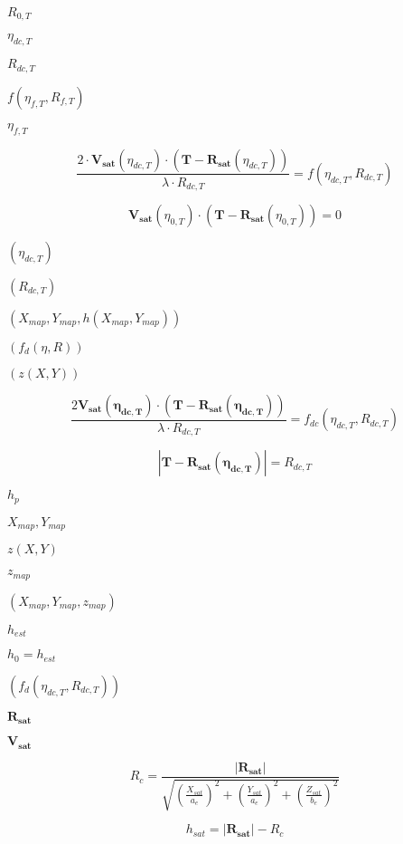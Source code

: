 \documentclass{article}
\begin{document}
$R_{0,T}$
\pagebreak

$\eta_{dc,T}$
\pagebreak

$R_{dc,T}$
\pagebreak

$f\left(\eta_{f,T},R_{f,T}\right)$
\pagebreak

$ \eta_{f,T}$
\pagebreak

\[ \frac{2 \cdot \mathbf{V_{sat}}\left( \eta_{dc,T} \right) \cdot \left( \mathbf{T} - \mathbf{R_{sat}}\left(\eta_{dc,T}\right) \right)}{\lambda \cdot R_{dc,T}} = f\left(\eta_{dc,T}, R_{dc,T}\right) \]
\pagebreak

\[ \mathbf{V_{sat}}\left( \eta_{0,T} \right) \cdot \left( \mathbf{T} - \mathbf{R_{sat}}\left(\eta_{0,T}\right) \right) = 0 \]
\pagebreak

$ \left( \eta_{dc,T} \right) $
\pagebreak

$\left( R_{dc,T}\right) $
\pagebreak

$\left(X_{map}, Y_{map}, h\left(X_{map}, Y_{map}\right)\right)$
\pagebreak

$\left( f_d\left(\eta,R\right)\right)$
\pagebreak

$ \left(z\left( X, Y\right)\right)$
\pagebreak

\[ \frac{2 \mathbf{V_{sat}\left(\eta_{dc,T}\right)} \cdot \left( \mathbf{T} - \mathbf{R_{sat}\left(\eta_{dc,T}\right)} \right)}{\lambda \cdot R_{dc,T}} = f_{dc}\left(\eta_{dc,T}, R_{dc,T} \right) \]
\pagebreak

\[ \left| \mathbf{T} - \mathbf{R_{sat}\left(\eta_{dc,T}\right)} \right | = R_{dc,T} \]
\pagebreak

$h_p$
\pagebreak

$X_{map}, Y_{map}$
\pagebreak

$ z\left(X,Y\right) $
\pagebreak

$z_{map}$
\pagebreak

$\left(X_{map}, Y_{map}, z_{map}\right)$
\pagebreak

$h_{est}$
\pagebreak

$h_0 = h_{est}$
\pagebreak

$ \left( f_{d}\left(\eta_{dc,T}, R_{dc,T}\right) \right) $
\pagebreak

$\mathbf{R_{sat}}$
\pagebreak

$\mathbf{V_{sat}}$
\pagebreak

\[ R_c =\frac{\left| \mathbf{R_{sat}}\right|} {\sqrt{ \left( \frac{X_{sat}}{a_e} \right)^2 + \left( \frac{Y_{sat}}{a_e} \right)^2 + \left( \frac{Z_{sat}}{b_e} \right)^2 }} \]
\pagebreak

\[ h_{sat} = \left| \mathbf{R_{sat}} \right| - R_c \]
\pagebreak
\end{document}
